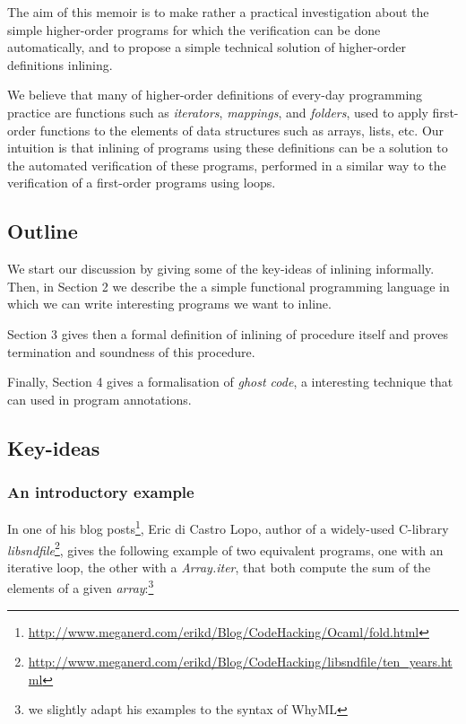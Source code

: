 \documentclass[a4paper,11pt,oneside]{article}
\theoremstyle{plain}
\newcommand{\meganerd}	
	{\url{http://www.meganerd.com/erikd/Blog/CodeHacking/Ocaml/fold.html}}
\newcommand{\libsndfile}
{\url{
http://www.meganerd.com/erikd/Blog/CodeHacking/libsndfile/ten_years.html}}
\begin{document}
 The aim of this memoir is to make rather a practical investigation about the simple higher-order programs for which the verification can be done automatically, and to propose a simple technical solution of higher-order definitions inlining. 
	
	We believe that many of higher-order definitions of every-day programming practice  
are functions such as \textit{iterators}, \textit{mappings}, and \textit{folders},
used to apply first-order functions to the elements
of data structures such as arrays, lists, etc.  
 Our intuition is that inlining of programs using these definitions can be a solution to the automated verification of these programs, performed in a similar way to the verification of a first-order programs using loops.	
	
	\subsection{Outline}	
	
  We start our discussion by giving some of the key-ideas of inlining informally.
  Then, in Section 2 we describe the a simple functional programming language in which we can write interesting programs we want to inline. 
   
	Section 3 gives then a formal definition of inlining of procedure itself and proves  termination and soundness of this procedure. 

	Finally, Section 4 gives a formalisation of \textit{ghost code}, a interesting technique that can used in program annotations.
	 
 
  
	
\subsection{Key-ideas}		

\subsubsection*{An introductory example}			
	
	In one of his blog posts\footnote{\meganerd}, Eric di Castro Lopo, author of a widely-used C-library \textit{libsndfile}\footnote{\libsndfile}, gives the following example of two equivalent programs, one with an iterative loop, the other with a \textit{Array.iter}, that both compute the sum of the elements of a given \textit{array}:\vspace{-0.5cm}\footnote{we slightly adapt his examples to the syntax of WhyML} 
\end{document}
